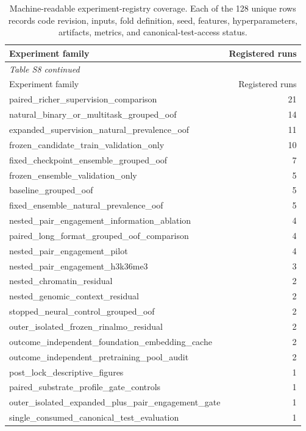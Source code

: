 \begin{longtable}{p{}r}
\caption{Machine-readable experiment-registry coverage. Each of the 128 unique rows records code revision, inputs, fold definition, seed, features, hyperparameters, artifacts, metrics, and canonical-test-access status.}\label{tab:registry}\\
\toprule
Experiment family & Registered runs \\
\midrule
\endfirsthead
\multicolumn{2}{l}{\textit{Table S8 continued}}\\
\toprule
Experiment family & Registered runs \\
\midrule
\endhead
paired\_richer\_supervision\_comparison & 21 \\
natural\_binary\_or\_multitask\_grouped\_oof & 14 \\
expanded\_supervision\_natural\_prevalence\_oof & 11 \\
frozen\_candidate\_train\_validation\_only & 10 \\
fixed\_checkpoint\_ensemble\_grouped\_oof & 7 \\
frozen\_ensemble\_validation\_only & 5 \\
baseline\_grouped\_oof & 5 \\
fixed\_ensemble\_natural\_prevalence\_oof & 5 \\
nested\_pair\_engagement\_information\_ablation & 4 \\
paired\_long\_format\_grouped\_oof\_comparison & 4 \\
nested\_pair\_engagement\_pilot & 4 \\
nested\_pair\_engagement\_h3k36me3 & 3 \\
nested\_chromatin\_residual & 2 \\
nested\_genomic\_context\_residual & 2 \\
stopped\_neural\_control\_grouped\_oof & 2 \\
outer\_isolated\_frozen\_rinalmo\_residual & 2 \\
outcome\_independent\_foundation\_embedding\_cache & 2 \\
outcome\_independent\_pretraining\_pool\_audit & 2 \\
post\_lock\_descriptive\_figures & 1 \\
paired\_substrate\_profile\_gate\_controls & 1 \\
outer\_isolated\_expanded\_plus\_pair\_engagement\_gate & 1 \\
single\_consumed\_canonical\_test\_evaluation & 1 \\

\end{longtable}
